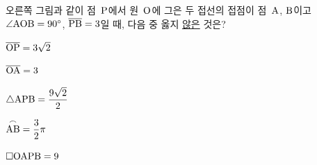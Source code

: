 \noindent\begin{minipage}[t]{0.58\linewidth}\vspace{0pt}\raggedright 오른쪽 그림과 같이 점~$\mathrm{P}$에서 원~$\mathrm{O}$에 그은 두 접선의 접점이 점~$\mathrm{A}$, $\mathrm{B}$이고 $\angle\mathrm{AOB}=90^\circ$, $\overline{\mathrm{PB}}=3$일 때, 다음 중 옳지 \underline{않은} 것은?\end{minipage}\hfill\begin{minipage}[t]{0.4\linewidth}\vspace{0pt}\centering \resizebox{\ifdim\width>\linewidth\linewidth\else\width\fi}{!}{}\end{minipage}\par
\begin{choicesii}{\rule[-3ex]{0pt}{8ex}$\overline{\mathrm{OP}}=3\sqrt{2}$}{\rule[-3ex]{0pt}{8ex}$\overline{\mathrm{OA}}=3$}{\rule[-3ex]{0pt}{8ex}$\triangle\mathrm{APB}=\dfrac{9\sqrt{2}}{2}$}{\rule[-3ex]{0pt}{8ex}$\overset{\frown}{\mathrm{AB}}=\dfrac{3}{2}\pi$}{\rule[-3ex]{0pt}{8ex}$\square\mathrm{OAPB}=9$}\end{choicesii}
